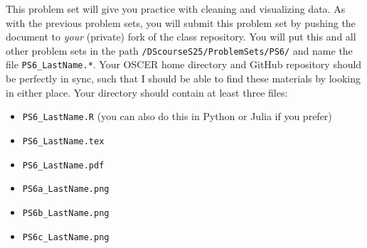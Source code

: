 \documentclass[12pt,english]{exam}
\begin{document}
This problem set will give you practice with cleaning and visualizing data.
As with the previous problem sets, you will submit this problem set by pushing the document to \emph{your} (private) fork of the class repository. You will put this and all other problem sets in the path \texttt{/DScourseS25/ProblemSets/PS6/} and name the file \texttt{PS6\_LastName.*}. Your OSCER home directory and GitHub repository should be perfectly in sync, such that I should be able to find these materials by looking in either place. Your directory should contain at least three files:
\begin{itemize}
    \item \texttt{PS6\_LastName.R} (you can also do this in Python or Julia if you prefer)
    \item \texttt{PS6\_LastName.tex}
    \item \texttt{PS6\_LastName.pdf}
    \item \texttt{PS6a\_LastName.png}
    \item \texttt{PS6b\_LastName.png}
    \item \texttt{PS6c\_LastName.png}
\end{itemize}
\end{document}
